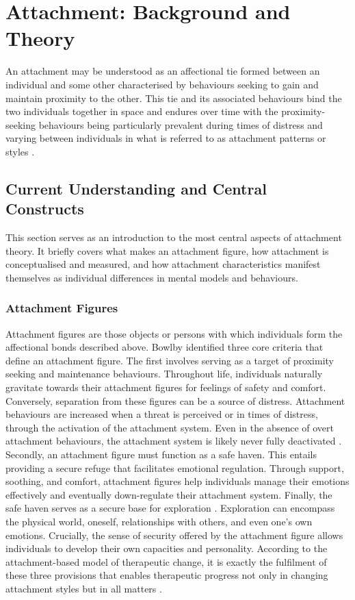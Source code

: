 \documentclass[12pt]{report}
\begin{document}
\chapter{Attachment: Background and Theory}
An attachment may be understood as an affectional tie formed between an individual and some other characterised by behaviours seeking to gain and maintain proximity to the other.
This tie and its associated behaviours bind the two individuals together in space and endures over time with the proximity-seeking behaviours being particularly prevalent during times of distress and varying between individuals in what is referred to as attachment patterns or styles \cite{Ainsworth1970,Bowlby1988}.

\section{Current Understanding and Central Constructs}
\label{sec: Current understanding}
This section serves as an introduction to the most central aspects of attachment theory.
It briefly covers what makes an attachment figure, how attachment is conceptualised and measured, and how attachment characteristics manifest themselves as individual differences in mental models and behaviours.

\subsection*{Attachment Figures}
Attachment figures are those objects or persons with which individuals form the affectional bonds described above.
Bowlby \citeyear{Bowlby1969attachment} identified three core criteria that define an attachment figure.
The first involves serving as a target of proximity seeking and maintenance behaviours.
Throughout life, individuals naturally gravitate towards their attachment figures for feelings of safety and comfort.
Conversely, separation from these figures can be a source of distress.
Attachment behaviours are increased when a threat is perceived or in times of distress, through the activation of the attachment system.
Even in the absence of overt attachment behaviours, the attachment system is likely never fully deactivated \cite{Bowlby1969attachment}.
Secondly, an attachment figure must function as a safe haven. This entails providing a secure refuge that facilitates emotional regulation.
Through support, soothing, and comfort, attachment figures help individuals manage their emotions effectively and eventually down-regulate their attachment system.
Finally, the safe haven serves as a secure base for exploration \cite{Bowlby1969attachment}.
Exploration can encompass the physical world, oneself, relationships with others, and even one's own emotions.
Crucially, the sense of security offered by the attachment figure allows individuals to develop their own capacities and personality.
According to the attachment-based model of therapeutic change, it is exactly the fulfilment of these three provisions that enables therapeutic progress not only in changing attachment styles but in all matters .
\end{document}
